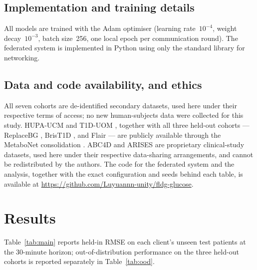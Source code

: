 \documentclass[10pt,letterpaper]{article}
\begin{document}
\subsection*{Implementation and training details}

All models are trained with the Adam optimiser (learning rate~$10^{-4}$, weight
decay~$10^{-3}$, batch size~256, one local epoch per communication round). The
federated system is implemented in Python using only the standard library for
networking.

\subsection*{Data and code availability, and ethics}

All seven cohorts are de-identified secondary datasets, used here under their
respective terms of access; no new human-subjects data were collected for this
study. HUPA-UCM \cite{hidalgo2024hupaucm} and T1D-UOM \cite{alsuhaymi2025t1duom},
together with all three held-out cohorts --- ReplaceBG
\cite{aleppo2017replacebg}, BrisT1D \cite{james2025brist1d}, and Flair
\cite{jaeb_flair} --- are publicly available through the MetaboNet consolidation
\cite{wolff2026metabonet}. ABC4D \cite{abc4d_nct} and ARISES
\cite{zhu2022arises} are proprietary clinical-study datasets, used here under
their respective data-sharing arrangements, and cannot be redistributed by the
authors. The code for the federated system and the analysis, together with the
exact configuration and seeds behind each table, is available at
\url{https://github.com/Luyuannn-unity/fldg-glucose}.

\section*{Results}

Table~\ref{tab:main} reports held-in RMSE on each client's unseen test patients at
the 30-minute horizon; out-of-distribution performance on
the three held-out cohorts is reported separately in Table~\ref{tab:ood}.
\end{document}
